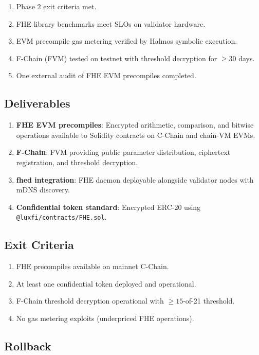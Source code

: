 \documentclass[11pt]{article}
\begin{document}
\begin{enumerate}
\item Phase 2 exit criteria met.
\item FHE library benchmarks meet SLOs \cite{fhe-benchmarks} on validator hardware.
\item EVM precompile gas metering verified by Halmos symbolic execution.
\item F-Chain (FVM) tested on testnet with threshold decryption for $\geq 30$ days.
\item One external audit of FHE EVM precompiles completed.
\end{enumerate}

\subsection{Deliverables}

\begin{enumerate}
\item \textbf{FHE EVM precompiles}: Encrypted arithmetic, comparison, and bitwise operations available to Solidity contracts on C-Chain and chain-VM EVMs.
\item \textbf{F-Chain}: FVM providing public parameter distribution, ciphertext registration, and threshold decryption.
\item \textbf{fhed integration}: FHE daemon deployable alongside validator nodes with mDNS discovery.
\item \textbf{Confidential token standard}: Encrypted ERC-20 using \texttt{@luxfi/contracts/FHE.sol}.
\end{enumerate}

\subsection{Exit Criteria}

\begin{enumerate}
\item FHE precompiles available on mainnet C-Chain.
\item At least one confidential token deployed and operational.
\item F-Chain threshold decryption operational with $\geq 15$-of-21 threshold.
\item No gas metering exploits (underpriced FHE operations).
\end{enumerate}

\subsection{Rollback}
\end{document}

